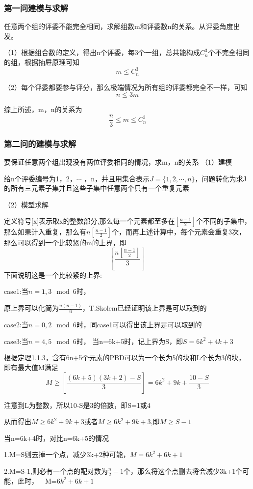 \documentclass{my_paper}
\begin{document}
	\subsubsection{第一问建模与求解}
	任意两个组的评委不能完全相同，求解组数m和评委数n的关系。从评委角度出发。
	
	（1）根据组合数的定义，得出n个评委，每3个一组，总共能构成$C_n^3$个不完全相同的组，根据抽屉原理可知
	$$m \leq C_n^3$$
	
	（2）每个评委都要参与评分，那么极端情况为所有组的评委都完全不一样，可知
	$$n \leq 3m $$
	
	综上所述，m，n的关系为
	$$\frac{n}{3} \leq m \leq C_n^3$$
	\subsubsection{第二问的建模与求解}
	要保证任意两个组出现没有两位评委相同的情况，求m，n的关系
	（1）建模
	
	给n个评委编号为1，2，$\cdots$ ，n，并且用集合表示$J=\{ 1,2,\cdots,n \}$，问题转化为求J的所有三元素子集并且这些子集中任意两个只有一个重复元素
	
	（2）模型求解
	
	定义符号[x]表示取x的整数部分,那么每一个元素都至多在$[\frac{n-1}{2}]$个不同的子集中，那么如果计入重复，那么有$n [ \frac{n-1}{2} ]$个，而再上述计算中，每个元素会重复3次，那么可以得到一个比较紧的m的上界，即
	$$[\frac{n [ \frac{n-1}{2} ]}{3}]$$
	下面说明这是一个比较紧的上界:
	
	case1:当$n =1,3 \mod 6$时，
	
	原上界可以化简为$\frac{n(n-1)}{6}$，T.Skolem已经证明该上界是可以取到的 \cite{ref1}
	
	case2:当$n=0,2 \mod 6$时，同case1可以得出该上界是可以取到的
	
	case3:当$n=4,5 \mod 6$时，
	当n=6k+5时，记上界为S，即$S=6k^2+4k+3$
	
	根据定理1.1.3\cite{ref2}，含有6n+5个元素的PBD可以为一个长为5的块和L个长为3的块，即有最大值M满足
	$$M \geq [\frac{(6k+5)(3k+2)-S}{3}] =6k^2+9k+\frac{10-S}{3}$$
	
	注意到L为整数，所以10-S是3的倍数，即S=1或4
	
	从而得出$M \geq 6k^2+9k+3$或者$M \geq 6k^2+9k+3$,即$M\geq S-1$
	
	当n=6k+4时，对比n=6k+5的情况
	
	1.M=S则去掉一个点，减少3k+2种可能，$M=6k^2+6k+1$
	
	2.M=S-1,则必有一个点的配对数为$\frac{n}{2}-1$个，那么将这个点删去将会减少3k+1个可能，此时，$\mbox{            }$ M=$6k^2+6k+1$
	
\end{document}
